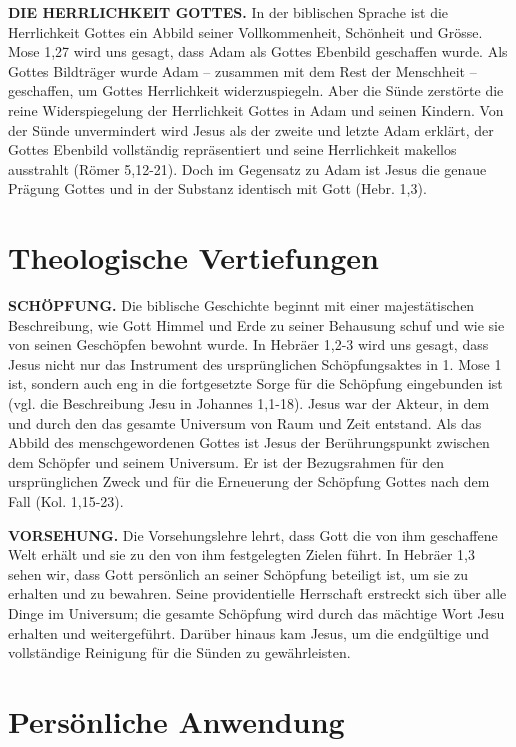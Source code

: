 \documentclass[headsepline=true]{book}
\begin{document}
\textbf{DIE HERRLICHKEIT GOTTES.} In der biblischen Sprache ist die
Herrlichkeit Gottes ein Abbild seiner Vollkommenheit, Schönheit und
Grösse. Mose 1,27 wird uns gesagt, dass Adam als Gottes Ebenbild
geschaffen wurde. Als Gottes Bildträger wurde Adam -- zusammen mit dem
Rest der Menschheit -- geschaffen, um Gottes Herrlichkeit
widerzuspiegeln. Aber die Sünde zerstörte die reine Widerspiegelung der
Herrlichkeit Gottes in Adam und seinen Kindern. Von der Sünde
unvermindert wird Jesus als der zweite und letzte Adam erklärt, der
Gottes Ebenbild vollständig repräsentiert und seine Herrlichkeit
makellos ausstrahlt (Römer 5,12-21). Doch im Gegensatz zu Adam ist Jesus
die genaue Prägung Gottes und in der Substanz identisch mit Gott (Hebr.
1,3).

\section{Theologische Vertiefungen}\label{theologische-vertiefungen}

\textbf{SCHÖPFUNG.} Die biblische Geschichte beginnt mit einer
majestätischen Beschreibung, wie Gott Himmel und Erde zu seiner
Behausung schuf und wie sie von seinen Geschöpfen bewohnt wurde. In
Hebräer 1,2-3 wird uns gesagt, dass Jesus nicht nur das Instrument des
ursprünglichen Schöpfungsaktes in 1. Mose 1 ist, sondern auch eng in die
fortgesetzte Sorge für die Schöpfung eingebunden ist (vgl. die
Beschreibung Jesu in Johannes 1,1-18). Jesus war der Akteur, in dem und
durch den das gesamte Universum von Raum und Zeit entstand. Als das
Abbild des menschgewordenen Gottes ist Jesus der Berührungspunkt
zwischen dem Schöpfer und seinem Universum. Er ist der Bezugsrahmen für
den ursprünglichen Zweck und für die Erneuerung der Schöpfung Gottes
nach dem Fall (Kol. 1,15-23).

\textbf{VORSEHUNG.} Die Vorsehungslehre lehrt, dass Gott die von ihm
geschaffene Welt erhält und sie zu den von ihm festgelegten Zielen
führt. In Hebräer 1,3 sehen wir, dass Gott persönlich an seiner
Schöpfung beteiligt ist, um sie zu erhalten und zu bewahren. Seine
providentielle Herrschaft erstreckt sich über alle Dinge im Universum;
die gesamte Schöpfung wird durch das mächtige Wort Jesu erhalten und
weitergeführt. Darüber hinaus kam Jesus, um die endgültige und
vollständige Reinigung für die Sünden zu gewährleisten.

\section{Persönliche Anwendung}\label{persuxf6nliche-anwendung}
\end{document}
